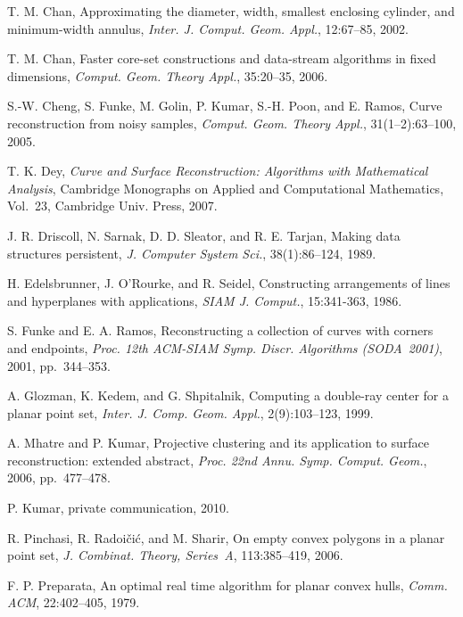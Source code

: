 \documentclass{llncs}
\begin{document}
\begin{thebibliography}{99}
T. M. Chan,
Approximating the diameter, width, smallest enclosing cylinder, and
minimum-width annulus, 
\emph{Inter. J. Comput. Geom. Appl.}, 12:67--85, 2002.

T. M. Chan,
Faster core-set constructions and data-stream algorithms in fixed dimensions,
\emph{Comput. Geom. Theory Appl.}, 35:20--35, 2006.


S.-W. Cheng, S. Funke, M. Golin, P. Kumar, S.-H. Poon, and E. Ramos, 
Curve reconstruction from noisy samples,
\emph{Comput. Geom. Theory Appl.},
31(1--2):63--100, 2005.

T. K. Dey, \emph{Curve and Surface Reconstruction:
  Algorithms with Mathematical Analysis}, Cambridge Monographs on
Applied and Computational Mathematics, Vol.~23, Cambridge Univ. Press, 2007.

J. R. Driscoll, N. Sarnak, D. D. Sleator, and R. E. Tarjan, 
Making data structures persistent,
\emph{J. Computer System Sci.},
38(1):86--124, 1989.


 H. Edelsbrunner, J. O'Rourke, and R. Seidel,
Constructing arrangements of lines and hyperplanes with applications,
\emph{SIAM J. Comput.}, 15:341-363, 1986.

S. Funke and E. A. Ramos,
Reconstructing a collection of curves with corners and endpoints,
\emph{Proc. 12th ACM-SIAM Symp. Discr. Algorithms (SODA~2001)}, 2001, pp.~344--353.

 A. Glozman, K. Kedem, and G. Shpitalnik, 
Computing a double-ray center for a planar point set,
\emph{Inter. J. Comp. Geom. Appl.}, 2(9):103--123, 1999.

 A. Mhatre and P. Kumar,
Projective clustering and its application to surface reconstruction:
extended abstract, 
\emph{Proc. 22nd Annu. Symp. Comput. Geom.},
2006, pp.~477--478.




 P. Kumar, private communication, 2010.

R. Pinchasi, R. Radoi\v{c}i\'c, and M. Sharir,
On empty convex polygons in a planar point set,
\emph{J. Combinat. Theory, Series~A},
113:385--419, 2006.

F. P. Preparata,
An optimal real time algorithm for planar convex hulls,
\emph{Comm. ACM},
22:402--405, 1979.
\end{thebibliography}
\end{document}
